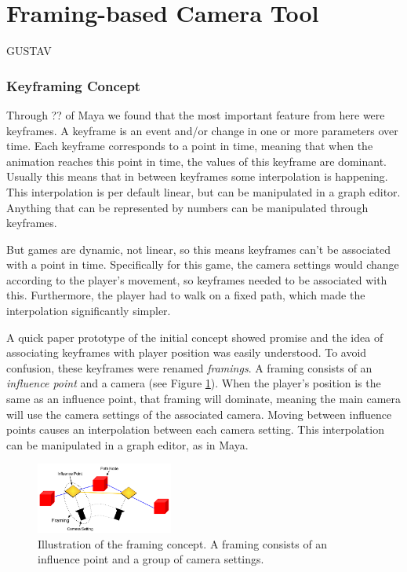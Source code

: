 \section{Framing-based Camera Tool}
GUSTAV

\subsubsection{Keyframing Concept}
Through ?? of Maya we found that the most important feature from here were keyframes.
A keyframe is an event and/or change in one or more parameters over time. Each keyframe corresponds to a point in time, meaning that when the animation reaches this point in time, the values of this keyframe are dominant. Usually this means that in between keyframes some interpolation is happening. This interpolation is per default linear, but can be manipulated in a graph editor. Anything that can be represented by numbers can be manipulated through keyframes.

But games are dynamic, not linear, so this means keyframes can't be associated with a point in time. Specifically for this game, the camera settings would change according to the player's movement, so keyframes needed to be associated with this. Furthermore, the player had to walk on a fixed path, which made the interpolation significantly simpler.

A quick paper prototype of the initial concept showed promise and the idea of associating keyframes with player position was easily understood. To avoid confusion, these keyframes were renamed \textit{framings}. A framing consists of an \textit{influence point} and a camera (see Figure \ref{fig:framingConcept}). When the player's position is the same as an influence point, that framing will dominate, meaning the main camera will use the camera settings of the associated camera. Moving between influence points causes an interpolation between each camera setting. This interpolation can be manipulated in a graph editor, as in Maya.

\begin{figure}[htbp]
\centering
\includegraphics[width=0.4\textwidth]{Pics/Instructions}
\caption{Illustration of the framing concept. A framing consists of an influence point and a group of camera settings.}
\label{fig:framingConcept}
\end{figure}

